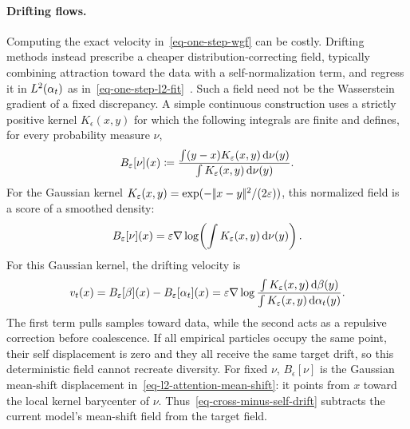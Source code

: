 \paragraph{Drifting flows.}

Computing the exact velocity in~\eqref{eq-one-step-wgf} can be costly. Drifting methods instead prescribe a cheaper distribution-correcting field, typically combining attraction toward the data with a self-normalization term, and regress it in $L^2(\alpha_t)$ as in~\eqref{eq-one-step-l2-fit}~\citep{Deng2026Drifting,Gretton2026DriftingWGF}. Such a field need not be the Wasserstein gradient of a fixed discrepancy. A simple continuous construction uses a strictly positive kernel $K_\epsilon(x,y)$ for which the following integrals are finite and defines, for every probability measure $\nu$,
\begin{equation}\label{eq-normalized-kernel-drift}
	B_\varepsilon[\nu](x)
	\coloneqq
	\frac{\int (y-x)K_\varepsilon(x,y)\,\mathrm{d}\nu(y)}
	     {\int K_\varepsilon(x,y)\,\mathrm{d}\nu(y)}.
\end{equation}
For the Gaussian kernel
$K_\varepsilon(x,y)=\exp(-|\!| x-y |\!|^2/(2\varepsilon))$, this normalized field is a score of a smoothed density:
\begin{equation}\label{eq-normalized-kernel-score}
	B_\varepsilon[\nu](x)
	=
	\varepsilon\nabla\log\!\left(\int K_\varepsilon(x,y)\,\mathrm{d}\nu(y)\right).
\end{equation}
For this Gaussian kernel, the drifting velocity is
\begin{equation}\label{eq-cross-minus-self-drift}
	v_t(x)=B_\varepsilon[\beta](x)-B_\varepsilon[\alpha_t](x)
	=
	\varepsilon\nabla\log
	\frac{\int K_\varepsilon(x,y)\,\mathrm{d}\beta(y)}
	     {\int K_\varepsilon(x,y)\,\mathrm{d}\alpha_t(y)}.
\end{equation}
The first term pulls samples toward data, while the second acts as a repulsive correction before coalescence. If all empirical particles occupy the same point, their self displacement is zero and they all receive the same target drift, so this deterministic field cannot recreate diversity. For fixed $\nu$, $B_\epsilon[\nu]$ is the Gaussian mean-shift displacement in~\eqref{eq-l2-attention-mean-shift}: it points from $x$ toward the local kernel barycenter of $\nu$. Thus~\eqref{eq-cross-minus-self-drift} subtracts the current model's mean-shift field from the target field.

